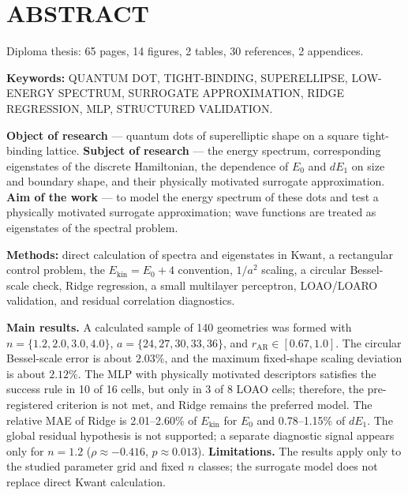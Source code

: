\chapter*{ABSTRACT}

Diploma thesis: 65 pages, 14 figures, 2 tables, 30 references, 2 appendices.

\textbf{Keywords:} QUANTUM DOT, TIGHT-BINDING, SUPERELLIPSE,
LOW-ENERGY SPECTRUM, SURROGATE APPROXIMATION,
RIDGE REGRESSION, MLP,
STRUCTURED VALIDATION.\par

\textbf{Object of research} --- quantum dots of superelliptic shape on a square tight-binding lattice. \textbf{Subject of research} --- the energy spectrum, corresponding eigenstates of the discrete Hamiltonian, the dependence of \(E_0\) and \(dE_1\) on size and boundary shape, and their physically motivated surrogate approximation. \textbf{Aim of the work} --- to model the energy spectrum of these dots and test a physically motivated surrogate approximation; wave functions are treated as eigenstates of the spectral problem.

\textbf{Methods:} direct calculation of spectra and eigenstates in Kwant, a rectangular control problem, the \(E_{\mathrm{kin}}=E_0+4\) convention, \(1/a^2\) scaling, a circular Bessel-scale check, Ridge regression, a small multilayer perceptron, LOAO/LOARO validation, and residual correlation diagnostics.

\textbf{Main results.} A calculated sample of 140 geometries was formed with \(n=\{1.2,2.0,3.0,4.0\}\), \(a=\{24,27,30,33,36\}\), and \(r_{\mathrm{AR}}\in[0.67,1.0]\). The circular Bessel-scale error is about \(2.03\%\), and the maximum fixed-shape scaling deviation is about \(2.12\%\). The MLP with physically motivated descriptors satisfies the success rule in 10 of 16 cells, but only in 3 of 8 LOAO cells; therefore, the pre-registered criterion is not met, and Ridge remains the preferred model. The relative MAE of Ridge is 2.01--2.60\% of \(E_{\mathrm{kin}}\) for \(E_0\) and 0.78--1.15\% of \(dE_1\). The global residual hypothesis is not supported; a separate diagnostic signal appears only for \(n=1.2\) (\(\rho\approx -0.416\), \(p\approx0.013\)). \textbf{Limitations.} The results apply only to the studied parameter grid and fixed \(n\) classes; the surrogate model does not replace direct Kwant calculation.
\par
